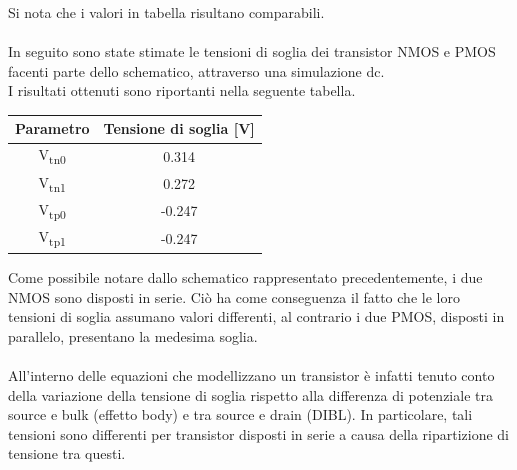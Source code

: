 \documentclass[11pt,  english, makeidx, a4paper, titlepage, oneside]{book}
\begin{document}
\vspace{0.3cm}
Si nota che i valori in tabella risultano comparabili.
\\\\
In seguito sono state stimate le tensioni di soglia dei transistor NMOS e PMOS facenti parte dello schematico, attraverso una simulazione dc.
\\
I risultati ottenuti sono riportanti nella seguente tabella.
\\
\begin{center}
	\begin{tabular}{|c|c|}
	\hline
	Parametro & Tensione di soglia [V] \\
	\hline
	 V\textsubscript{tn0} & 0.314\\
	\hline
	 V\textsubscript{tn1} & 0.272 \\
	\hline
	V\textsubscript{tp0} & -0.247 \\
	\hline
	V\textsubscript{tp1} & -0.247 \\
	\hline
	\end{tabular}	
\end{center}
\vspace{0.3cm}
Come possibile notare dallo schematico rappresentato precedentemente, i due NMOS sono disposti in serie. Ciò ha come conseguenza il fatto che le loro tensioni di soglia assumano valori differenti, al contrario i due PMOS, disposti in parallelo, presentano la medesima soglia.
\\\\
All'interno delle equazioni che modellizzano un transistor è infatti tenuto conto della variazione della tensione di soglia rispetto alla differenza di potenziale tra source e bulk (effetto body) e tra source e drain (DIBL). In particolare, tali tensioni sono differenti per transistor disposti in serie a causa della ripartizione di tensione tra questi.
\\\\
\end{document}
